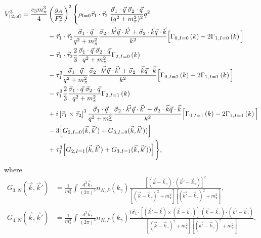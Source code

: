 \begin{equation}\begin{split}
 V_{12,\text{eff}}^3 = \frac{c_3 m_\pi^3}{4}& \left(\frac{g_A}{F_\pi^2}\right)^2
 \Bigg\{ \rho_{\text{I}=0} \vec{\tau}_1\cdot\vec{\tau}_2 \; \frac{\vec{\sigma}_1\cdot\vec{q}\;\vec{\sigma}_2\cdot\vec{q}}{(q^2+m_\pi^2)^2}q^2 \\
& - \vec{\tau}_1\cdot\vec{\tau}_2 \frac{\vec{\sigma}_1 \cdot \vec{q}}{q^2+m_\pi^2}\frac{\vec{\sigma}_2\cdot\vec{k'}\vec{q}\cdot\vec{k}'+\vec{\sigma}_2\cdot\vec{k}\vec{q}\cdot\vec{k}}{k^2}\Big[\Gamma_{0, I=0}\left(k\right)-2\Gamma_{1, I=0}\left(k\right)\Big] \\
& -\vec{\tau}_1\cdot\vec{\tau}_2\frac{2}{3}\frac{\vec{\sigma}_1 \cdot \vec{q}\;\vec{\sigma}_2 \cdot \vec{q}}{q^2+m_\pi^2}\Gamma_{2, I=0}\left(k\right) \\
& - \tau_1^3 \frac{\vec{\sigma}_1 \cdot \vec{q}}{q^2+m_\pi^2}\frac{\vec{\sigma}_2\cdot\vec{k'}\vec{q}\cdot\vec{k}'+\vec{\sigma}_2\cdot\vec{k}\vec{q}\cdot\vec{k}}{k^2}\Big[\Gamma_{0, I=1}\left(k\right)-2\Gamma_{1, I=1}\left(k\right)\Big] \\
& -\tau_1^3\frac{2}{3}\frac{\vec{\sigma}_1 \cdot \vec{q}\;\vec{\sigma}_2 \cdot \vec{q}}{q^2+m_\pi^2}\Gamma_{2, I=1}\left(k\right) \\
& + i\left[\vec{\tau}_1\times\vec{\tau}_2\right]^3 \frac{\vec{\sigma}_1 \cdot \vec{q}}{q^2+m_\pi^2}\frac{\vec{\sigma}_2\cdot\vec{k'}\vec{q}\cdot\vec{k}'-\vec{\sigma}_2\cdot\vec{k}\vec{q}\cdot\vec{k}}{k^2}\Big[\Gamma_{0, I=1}\left(k\right)-2\Gamma_{1, I=1}\left(k\right)\Big] \\
& -3 \Big[ G_{2,I=0}(\vec{k},\vec{k}')+G_{3,I=0}(\vec{k},\vec{k}')) \Big]\\
& +\tau_1^3\Big[ G_{2,I=1}(\vec{k},\vec{k}')+G_{3,I=1}(\vec{k},\vec{k}')) \Big]\Bigg\},
\end{split}
 \end{equation}
where
\begin{align}
G_{3,N}(\vec{k},\vec{k}') & = \frac{1}{m_\pi^3}\int\frac{d^3\vec{k}_\gamma}{(2\pi)^3} n_{N,P}(k_\gamma) \frac{\left[(\vec{k}-\vec{k}_\gamma)\cdot(\vec{k}'-\vec{k}_\gamma) \right]^2}{[(\vec{k}-\vec{k}_\gamma)^2+m_\pi^2][(\vec{k'}-\vec{k}_\gamma)^2+m_\pi^2]}, \\
%
G_{4,N}(\vec{k},\vec{k}') & = \frac{1}{m_\pi^3}\int\frac{d^3\vec{k}_\gamma}{(2\pi)^3} n_{N,P}(k_\gamma) \frac{i\vec{\sigma}_1\cdot\left[(\vec{k}'-\vec{k})\times(\vec{k}-\vec{k}_\gamma)\right]\;(\vec{k}-\vec{k}_\gamma)\cdot(\vec{k}'-\vec{k}_\gamma) }{[(\vec{k}-\vec{k}_\gamma)^2+m_\pi^2][(\vec{k'}-\vec{k}_\gamma)^2+m_\pi^2]}.
\end{align}

